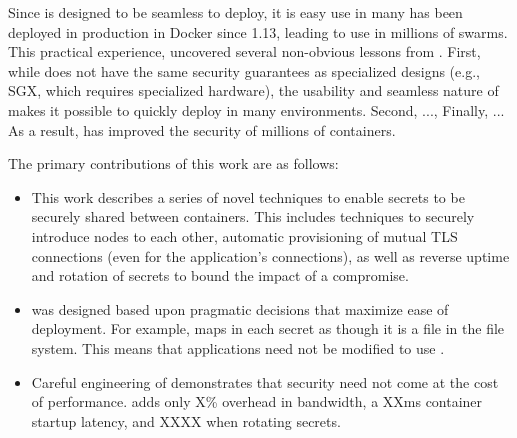Since \sysname is designed to be seamless to deploy, it is easy use 
in many 
\sysname has been deployed in production in Docker since 1.13, leading to 
use in millions of swarms.  This practical experience, uncovered several
non-obvious lessons from \sysname.  First, while \sysname does not have the 
same security guarantees as specialized designs (e.g., SGX, which requires
specialized hardware), the usability and seamless nature of \sysname makes it
possible to quickly deploy in many environments.    Second, ..., Finally, ...
As a result, \sysname has improved the security of millions of containers.


The primary contributions of this work are as follows:

\begin{itemize}

\item This work describes a series of novel techniques to enable secrets to
be securely shared between containers.  This includes techniques to
securely introduce nodes to each other, automatic provisioning of mutual
TLS connections (even for the application's connections), as well as reverse 
uptime and rotation of secrets to bound the impact of a compromise.

\item \sysname was designed based upon pragmatic decisions that maximize 
ease of deployment.  For example, \sysname maps in each secret
as though it is a file in the file system.  This means that applications
need not be modified to use \sysname.  

\item Careful engineering of \sysname demonstrates that security need not
come at the cost of performance.  \sysname adds only X\% overhead in 
bandwidth, a XXms container startup latency, and XXXX when rotating
secrets.


\end{itemize}



